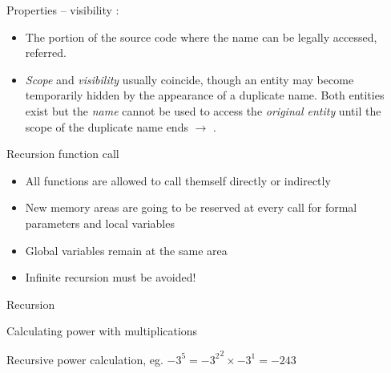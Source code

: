 \documentclass[usenames,dvipsnames,aspectratio=169]{beamer}
\begin{document}
\begin{frame}{Properties -- visibility}
  :
  \begin{itemize}
    \small
    \item The portion of the source code where the name can be legally accessed, referred.
    \item \emph{Scope} and \emph{visibility} usually coincide, though an entity may become temporarily hidden by the appearance of a duplicate name. Both entities exist but the \emph{name} cannot be used to access the \emph{original entity} until the scope of the duplicate name ends $\to$ .
  \end{itemize}
  \begin{exampleblock}{}
    \tiny
    \vspace{-.3cm}
    
    \vspace{-.3cm}
  \end{exampleblock}
\end{frame}

\begin{frame}{Recursion}
   function call
  \begin{itemize}
    \item All functions are allowed to call themself directly or indirectly
    \item New memory areas are going to be reserved at every call for formal parameters and local variables
    \item Global variables remain at the same area
    \item Infinite recursion must be avoided!
  \end{itemize}
  \begin{exampleblock}{}
    
  \end{exampleblock}
\end{frame}

\begin{frame}{Recursion}
  \scriptsize
  \begin{exampleblock}{ Calculating power with multiplications}
    \scriptsize
    \vspace{-.3cm}
    
    \vspace{-.3cm}
  \end{exampleblock}
  \begin{exampleblock}{ Recursive power calculation, eg. $-3^5 = {-3^2}^2 \times -3^1 = 
-243$}
    \scriptsize
    \vspace{-.3cm}
    
    \vspace{-.3cm}
  \end{exampleblock}
\end{frame}
\end{document}
